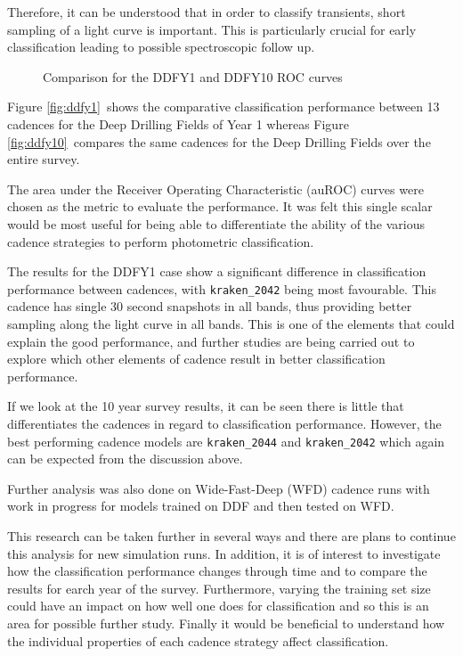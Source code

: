 Therefore, it can be understood that in order to classify transients, short
sampling of a light curve is important. This is particularly crucial for early classification
leading to possible spectroscopic follow up.


\begin{figure}
  \centering
  \caption{Comparison for the DDFY1 and DDFY10 ROC curves}\label{fig:rocs}
\end{figure}

Figure \ref{fig:ddfy1}~shows the comparative classification performance between 13 cadences for the Deep
Drilling Fields of Year 1 whereas Figure \ref{fig:ddfy10}~compares the same
cadences for the Deep Drilling Fields over the entire survey.

The area under the Receiver Operating Characteristic (auROC) curves were chosen as the metric
to evaluate the performance. It was felt this single scalar would be most useful
for being able to differentiate the ability of the various cadence strategies
to perform photometric classification.


The results for the DDFY1 case show a significant difference in classification
performance between cadences, with {\tt kraken\_2042} being most favourable.
This cadence has single 30 second snapshots in all bands, thus providing better
sampling along the light curve in all bands. This is one of the elements that could explain
the good performance, and further studies are being carried out to explore which
other elements of cadence result in better classification performance.

If we look at the 10 year survey results, it can be seen there is
little that differentiates the cadences in regard to classification performance.
However, the best performing cadence models are {\tt kraken\_2044} and
{\tt kraken\_2042} which again can be expected from the discussion above.

Further analysis was also done on Wide-Fast-Deep (WFD) cadence runs with work in
progress for models trained on DDF and then tested on WFD.

This research can be taken further in several ways and there are plans to
continue this analysis for new \opsim simulation runs.  In addition, it is
of interest to investigate how the classification performance changes through
time and to compare the results for earch year of the survey. Furthermore,
varying the training set size could have an impact on how well one does for
classification and so this is an area for possible further study.
Finally it would be beneficial to understand how the individual properties of each cadence
strategy affect classification.
